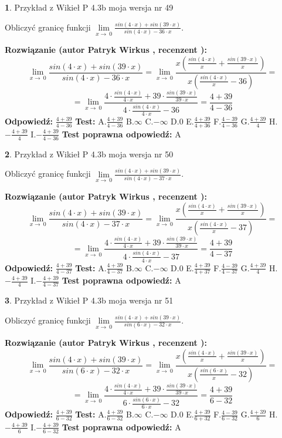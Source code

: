 \documentclass[12pt, a4paper]{article}
\theoremstyle{definition} %
\newtheorem{zad}{}
\newcommand{\zadStart}[1]{\begin{zad}#1\newline}
\newcommand{\zadStop}{\end{zad}}
\newcommand{\rozwStart}[2]{\noindent \textbf{Rozwiązanie (autor #1 , recenzent #2): }\newline}
\newcommand{\rozwStop}{\newline}
\newcommand{\odpStart}{\noindent \textbf{Odpowiedź:}\newline}
\newcommand{\odpStop}{\newline}
\newcommand{\testStart}{\noindent \textbf{Test:}\newline}
\newcommand{\testStop}{\newline}
\newcommand{\kluczStart}{\noindent \textbf{Test poprawna odpowiedź:}\newline}
\newcommand{\kluczStop}{\newline}
\begin{document}
\zadStart{Przykład z Wikieł P 4.3b moja wersja nr 49}


Obliczyć granicę funkcji $\lim\limits_{x\to\ 0}\frac{sin(4 \cdot x)+sin(39 \cdot x)}{sin(4 \cdot x)-36 \cdot x}$.
\zadStop
\rozwStart{Patryk Wirkus}{}
$$\lim\limits_{x\to\ 0}\frac{sin(4 \cdot x)+sin(39 \cdot x)}{sin(4 \cdot x)-36 \cdot x}=\lim\limits_{x\to\ 0}\frac{x(\frac{sin(4 \cdot x)}{x}+\frac{sin(39 \cdot x)}{x})}{x(\frac{sin(4 \cdot x)}{x}-36)}=$$
$$=\lim\limits_{x\to\ 0}\frac{4 \cdot \frac{sin(4 \cdot x)}{4 \cdot x}+39 \cdot \frac{sin(39 \cdot x)}{39 \cdot x}}{4 \cdot \frac{sin(4 \cdot x)}{4 \cdot x}-36}=\frac{4+39}{4-36}$$
\rozwStop
\odpStart
$\frac{4+39}{4-36}$
\odpStop
\testStart
A.$\frac{4+39}{4-36}$
B.$\infty$
C.$-\infty$
D.$0$
E.$\frac{4+39}{4+36}$
F.$\frac{4-39}{4-36}$
G.$\frac{4+39}{4}$
H.$-\frac{4+39}{4}$
I.$-\frac{4+39}{4-36}$
\testStop
\kluczStart
A
\kluczStop



\zadStart{Przykład z Wikieł P 4.3b moja wersja nr 50}


Obliczyć granicę funkcji $\lim\limits_{x\to\ 0}\frac{sin(4 \cdot x)+sin(39 \cdot x)}{sin(4 \cdot x)-37 \cdot x}$.
\zadStop
\rozwStart{Patryk Wirkus}{}
$$\lim\limits_{x\to\ 0}\frac{sin(4 \cdot x)+sin(39 \cdot x)}{sin(4 \cdot x)-37 \cdot x}=\lim\limits_{x\to\ 0}\frac{x(\frac{sin(4 \cdot x)}{x}+\frac{sin(39 \cdot x)}{x})}{x(\frac{sin(4 \cdot x)}{x}-37)}=$$
$$=\lim\limits_{x\to\ 0}\frac{4 \cdot \frac{sin(4 \cdot x)}{4 \cdot x}+39 \cdot \frac{sin(39 \cdot x)}{39 \cdot x}}{4 \cdot \frac{sin(4 \cdot x)}{4 \cdot x}-37}=\frac{4+39}{4-37}$$
\rozwStop
\odpStart
$\frac{4+39}{4-37}$
\odpStop
\testStart
A.$\frac{4+39}{4-37}$
B.$\infty$
C.$-\infty$
D.$0$
E.$\frac{4+39}{4+37}$
F.$\frac{4-39}{4-37}$
G.$\frac{4+39}{4}$
H.$-\frac{4+39}{4}$
I.$-\frac{4+39}{4-37}$
\testStop
\kluczStart
A
\kluczStop



\zadStart{Przykład z Wikieł P 4.3b moja wersja nr 51}


Obliczyć granicę funkcji $\lim\limits_{x\to\ 0}\frac{sin(4 \cdot x)+sin(39 \cdot x)}{sin(6 \cdot x)-32 \cdot x}$.
\zadStop
\rozwStart{Patryk Wirkus}{}
$$\lim\limits_{x\to\ 0}\frac{sin(4 \cdot x)+sin(39 \cdot x)}{sin(6 \cdot x)-32 \cdot x}=\lim\limits_{x\to\ 0}\frac{x(\frac{sin(4 \cdot x)}{x}+\frac{sin(39 \cdot x)}{x})}{x(\frac{sin(6 \cdot x)}{x}-32)}=$$
$$=\lim\limits_{x\to\ 0}\frac{4 \cdot \frac{sin(4 \cdot x)}{4 \cdot x}+39 \cdot \frac{sin(39 \cdot x)}{39 \cdot x}}{6 \cdot \frac{sin(6 \cdot x)}{6 \cdot x}-32}=\frac{4+39}{6-32}$$
\rozwStop
\odpStart
$\frac{4+39}{6-32}$
\odpStop
\testStart
A.$\frac{4+39}{6-32}$
B.$\infty$
C.$-\infty$
D.$0$
E.$\frac{4+39}{6+32}$
F.$\frac{4-39}{6-32}$
G.$\frac{4+39}{6}$
H.$-\frac{4+39}{6}$
I.$-\frac{4+39}{6-32}$
\testStop
\kluczStart
A
\kluczStop
\end{document}
